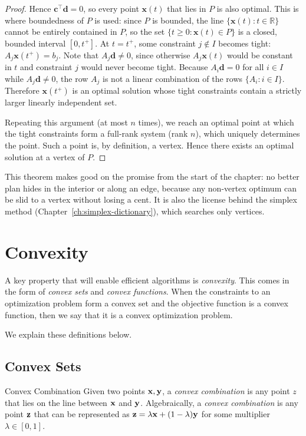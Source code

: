 \begin{proof}
Hence \( \mathbf{c}^\top \mathbf{d} = 0 \), so every point \( \mathbf{x}(t) \) that lies in \( P \) is also optimal. This is where boundedness of \( P \) is used: since \( P \) is bounded, the line \( \{ \mathbf{x}(t) : t \in \mathbb{R} \} \) cannot be entirely contained in \( P \), so the set \( \{ t \geq 0 : \mathbf{x}(t) \in P \} \) is a closed, bounded interval \( [0, t^+] \). At \( t = t^+ \), some constraint \( j \notin I \) becomes tight: \( A_j \mathbf{x}(t^+) = b_j \). Note that \( A_j \mathbf{d} \neq 0 \), since otherwise \( A_j \mathbf{x}(t) \) would be constant in \( t \) and constraint \( j \) would never become tight. Because \( A_i \mathbf{d} = 0 \) for all \( i \in I \) while \( A_j \mathbf{d} \neq 0 \), the row \( A_j \) is not a linear combination of the rows \( \{ A_i : i \in I \} \). Therefore \( \mathbf{x}(t^+) \) is an optimal solution whose tight constraints contain a strictly larger linearly independent set.

Repeating this argument (at most \( n \) times), we reach an optimal point at which the tight constraints form a full-rank system (rank \( n \)), which uniquely determines the point. Such a point is, by definition, a vertex. Hence there exists an optimal solution at a vertex of \( P \).
\end{proof}

This theorem makes good on the promise from the start of the chapter: no better plan hides in the interior or along an edge, because any non-vertex optimum can be slid to a vertex without losing a cent. It is also the license behind the simplex method (Chapter~\ref{ch:simplex-dictionary}), which searches only vertices.

\section{Convexity}\label{sec:convexity}
A key property that will enable efficient algorithms is \emph{convexity}.  This comes in the form of \emph{convex sets} and \emph{convex functions}.  When the constraints to an optimization problem form a convex set and the objective function is a convex function, then we say that it is a convex optimization problem.

We explain these definitions below.
\subsection{Convex Sets}

\begin{definition}{Convex Combination}
Given two points $\mathbf{x},\mathbf{y}$, a \emph{convex combination} is any point $z$ that lies on the line between $\mathbf{x}$ and $\mathbf{y}$.  Algebraically, a \emph{convex combination} is any point $\mathbf{z}$ that can be represented as $\mathbf{z} = \lambda \mathbf{x} + (	1-\lambda) \mathbf{y} $ for some multiplier $\lambda \in [0,1]$.
\end{definition}

